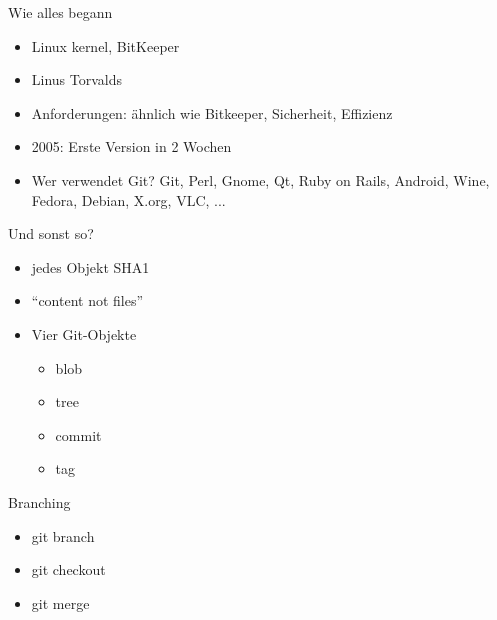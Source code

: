 \documentclass{beamer}
\begin{document}
\begin{frame}{Wie alles begann}{}

  \begin{itemize}
    \item Linux kernel, BitKeeper
    \item Linus Torvalds
    \item Anforderungen: ähnlich wie Bitkeeper, Sicherheit, Effizienz
    \item 2005: Erste Version in 2 Wochen
    \item Wer verwendet Git? Git, Perl, Gnome, Qt, Ruby on Rails, Android, Wine, Fedora, Debian, X.org, VLC, ...
  \end{itemize}

\end{frame}

\begin{frame}{Und sonst so?}{}

  \begin{itemize}
    \item jedes Objekt SHA1
    \item ``content not files''
    \item Vier Git-Objekte
    \begin{itemize}
     \item blob
     \item tree
     \item commit
     \item tag
    \end{itemize}
  \end{itemize}

\end{frame}

\begin{frame}

  \begin{block}{Branching}
    \begin{itemize}
      \item git branch
      \item git checkout
      \item git merge
    \end{itemize}
  \end{block} 

\end{frame}
\end{document}
